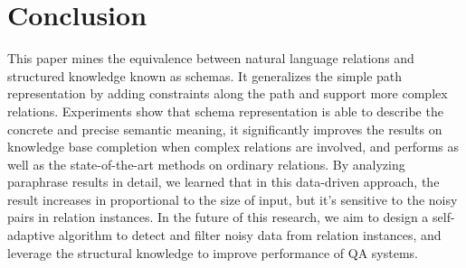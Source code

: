 \section{Conclusion}
This paper mines the equivalence between natural language relations and structured knowledge known as schemas.
It generalizes the simple path representation by adding constraints along the path and support more complex relations.
Experiments show that schema representation is able to describe the concrete and precise semantic meaning,
it significantly improves the results on knowledge base completion when complex relations are involved,
and performs as well as the state-of-the-art methods on ordinary relations.
By analyzing paraphrase results in detail, we learned that in this data-driven approach,
the result increases in proportional to the size of input, but it's sensitive to the noisy pairs in relation instances.
In the future of this research, we aim to design a self-adaptive algorithm to detect and filter noisy data
from relation instances, and leverage the structural knowledge to improve performance of QA systems.

%

